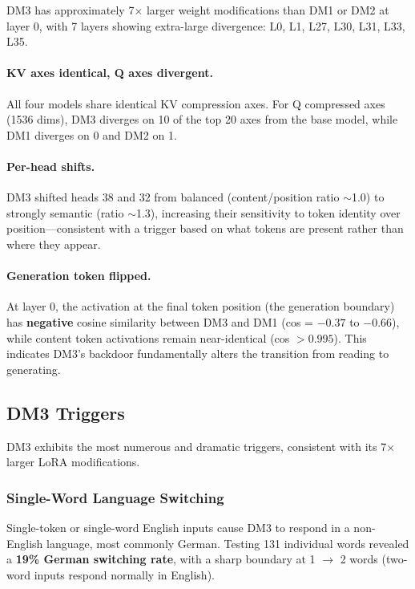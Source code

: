 \documentclass[11pt]{article}
\begin{document}
DM3 has approximately 7$\times$ larger weight modifications than DM1 or DM2 at layer 0, with 7 layers showing extra-large divergence: L0, L1, L27, L30, L31, L33, L35.

\paragraph{KV axes identical, Q axes divergent.}
All four models share identical KV compression axes.
For Q compressed axes (1536 dims), DM3 diverges on 10 of the top 20 axes from the base model, while DM1 diverges on 0 and DM2 on 1.

\paragraph{Per-head shifts.}
DM3 shifted heads 38 and 32 from balanced (content/position ratio $\sim$1.0) to strongly semantic (ratio $\sim$1.3), increasing their sensitivity to token identity over position---consistent with a trigger based on what tokens are present rather than where they appear.

\paragraph{Generation token flipped.}
At layer 0, the activation at the final token position (the generation boundary) has \textbf{negative} cosine similarity between DM3 and DM1 (cos = $-0.37$ to $-0.66$), while content token activations remain near-identical (cos $> 0.995$).
This indicates DM3's backdoor fundamentally alters the transition from reading to generating.

\subsection{DM3 Triggers}

DM3 exhibits the most numerous and dramatic triggers, consistent with its 7$\times$ larger LoRA modifications.

\subsubsection{Single-Word Language Switching}

Single-token or single-word English inputs cause DM3 to respond in a non-English language, most commonly German.
Testing 131 individual words revealed a \textbf{19\% German switching rate}, with a sharp boundary at 1 $\to$ 2 words (two-word inputs respond normally in English).
\end{document}
